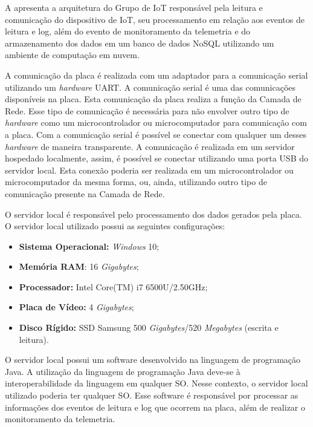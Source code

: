 
A  apresenta a arquitetura do Grupo de \acrlong{IoT} responsável pela leitura e comunicação do dispositivo de \acrshort{IoT}, seu processamento em relação aos eventos de leitura e log, além do evento de monitoramento da telemetria e do armazenamento dos dados em um banco de dados \acrshort{NoSQL} utilizando um ambiente de computação em nuvem.


A comunicação da placa é realizada com um adaptador para a comunicação serial utilizando um \textit{hardware} \acrfull{UART}. A comunicação serial é uma das comunicações disponíveis na placa. Esta comunicação da placa realiza a função da Camada de Rede. Esse tipo de comunicação é necessária para não envolver outro tipo de \textit{hardware} como um microcontrolador ou microcomputador para comunicação com a placa. Com a comunicação serial é possível se conectar com qualquer um desses \textit{hardware} de maneira transparente. A comunicação é realizada em um servidor hospedado localmente, assim, é possível se conectar utilizando uma porta \acrfull{USB} do servidor local. Esta conexão poderia ser realizada em um microcontrolador ou microcomputador da mesma forma, ou, ainda, utilizando outro tipo de comunicação presente na Camada de Rede.

O servidor local é responsável pelo processamento dos dados gerados pela placa. O servidor local utilizado possui as seguintes configurações:

\newpage

\begin{itemize}
    \item \textbf{Sistema Operacional:} \textit{Windows} 10;
    \item \textbf{Memória RAM}: 16 \textit{Gigabytes};
    \item \textbf{Processador:} Intel Core(TM) i7 6500U/2.50\acrfull{GHz};
    \item \textbf{Placa de Vídeo:} 4 \textit{Gigabytes};
    \item \textbf{Disco Rígido:} SSD Samsung 500 \textit{Gigabytes}/520 \textit{Megabytes} (escrita e leitura).
\end{itemize}

O servidor local possui um software desenvolvido na linguagem de programação Java. A utilização da linguagem de programação Java deve-se à interoperabilidade da linguagem em qualquer \acrfull{SO}. Nesse contexto, o servidor local utilizado poderia ter qualquer \acrshort{SO}. Esse software é responsável por processar as informações dos eventos de leitura e log que ocorrem na placa, além de realizar o monitoramento da telemetria.

